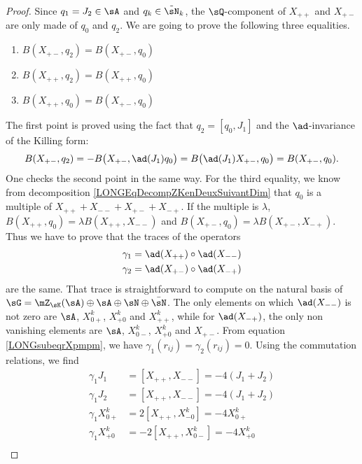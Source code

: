 \begin{proof}
	Since $q_1=J_2\in\sA$ and $q_k\in\tilde\sN_k$, the $\sQ$-component of $X_{++}$ and $X_{+-}$ are only made of $q_0$ and $q_2$.
	We are	going to prove the following three equalities.
	\begin{enumerate}

		\item\label{LONGItemBpmqDeux}
			$B(X_{+-},q_2)=B(X_{+-},q_0)$
		\item
			$B(X_{++},q_2)=B(X_{++},q_0)$
		\item
			$B(X_{++},q_0)=B(X_{+-},q_0)$
	\end{enumerate}

	The first point is proved using the fact that $q_2=[q_0,J_1]$ and the $\ad$-invariance of the Killing form:
	\begin{equation}
		B(X_{+-},q_2)=-B\big( X_{+-},\ad(J_1)q_0 \big)=B\big( \ad(J_1)X_{+-},q_0 \big)=B(X_{+-},q_0).
	\end{equation}
	One checks the second point in the same way. For the third equality, we know from decomposition \eqref{LONGEqDecompZKenDeuxSuivantDim} that $q_0$ is a multiple of $X_{++}+X_{--}+X_{+-}+X_{-+}$. If the multiple is $\lambda$, $B(X_{++},q_0)=\lambda B(X_{++},X_{--})$ and $B(X_{+-},q_0)=\lambda B(X_{+-},X_{-+})$. Thus we have to prove that the traces of the operators
	\begin{equation}
		\begin{aligned}[]
			\gamma_1&=\ad(X_{++})\circ\ad(X_{--})\\
			\gamma_2&=\ad(X_{+-})\circ\ad(X_{-+})
		\end{aligned}
	\end{equation}
	are the same. That trace is straightforward to compute on the natural basis of $\sG=\mZ_{\sK}(\sA)\oplus\sA\oplus\sN\oplus\bar\sN$.
	The only elements on which $\ad(X_{--})$ is not zero are $\sA$, $X^k_{0+}$, $X^k_{+0}$ and $X^k_{++}$, while for $\ad(X_{-+})$, the only non vanishing elements are $\sA$, $X^k_{0-}$, $X^k_{+0}$ and $X_{+-}$. From equation \eqref{LONGsubeqrXpmpm}, we have $\gamma_1(r_{ij})=\gamma_2(r_{ij})=0$. Using the commutation relations, we find
	\begin{subequations}
		\begin{align}
			\gamma_1J_1&=[X_{++},X_{--}]=-4(J_1+J_2) \\
			\gamma_1J_2&=[X_{++},X_{--}]=-4(J_1+J_2) \\
			\gamma_1X^k_{0+}&=2[X_{++},X^k_{-0}]=-4X^k_{0+} \\
			\gamma_1X^k_{+0}&=-2[X_{++},X^k_{0-}]=-4X^k_{+0} \\

\end{align}
\end{subequations}
\end{proof}
